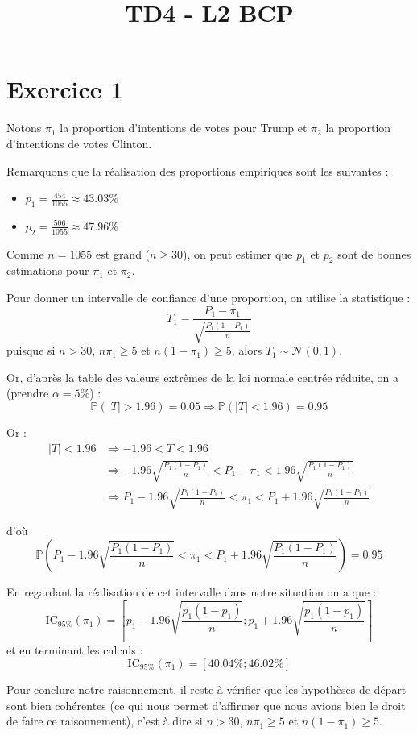 \documentclass[a4paper,oneside,12pt]{article}
\title{TD4 - L2 BCP}
\author{}
\date{}
\theoremstyle{plain}
\def\P{{\mathbb P}}
\begin{document}
\maketitle

\section*{Exercice 1}
Notons $\pi_1$ la proportion d'intentions de votes pour Trump et $\pi_2$ la proportion d'intentions de votes Clinton.

Remarquons que la réalisation des proportions empiriques sont les suivantes :
\begin{itemize}
    \item $p_1 = \frac{454}{1055} \approx 43.03\%$
    \item $p_2 = \frac{506}{1055} \approx 47.96\%$
\end{itemize}

Comme $n = 1055$ est grand ($n\ge 30$), on peut estimer que $p_1$ et $p_2$ sont de bonnes estimations pour $\pi_1$ et $\pi_2$.

Pour donner un intervalle de confiance d'une proportion, on utilise la statistique :
$$T_1 = \frac{P_1-\pi_1}{\sqrt{\frac{P_1(1-P_1)}{n}}}$$
puisque si $n>30$, $n\pi_1\ge 5$ et $n(1-\pi_1)\ge 5$, alors $T_1 \sim \mathcal{N}(0,1)$.

Or, d'après la table des valeurs extrêmes de la loi normale centrée réduite, on a (prendre $\alpha = 5\%$) :
$$\P(|T|>1.96) = 0.05 \Rightarrow \P(|T|<1.96) = 0.95$$

Or :
\begin{align*}
    |T|<1.96 &\Rightarrow -1.96 < T < 1.96\\
    & \Rightarrow -1.96\sqrt{\frac{P_1(1-P_1)}{n}}<P_1-\pi_1<1.96\sqrt{\frac{P_1(1-P_1)}{n}}\\
    & \Rightarrow P_1 -1.96\sqrt{\frac{P_1(1-P_1)}{n}}<\pi_1<P_1+1.96\sqrt{\frac{P_1(1-P_1)}{n}}
\end{align*}

d'où $$\P\left( P_1 -1.96\sqrt{\frac{P_1(1-P_1)}{n}}<\pi_1<P_1+1.96\sqrt{\frac{P_1(1-P_1)}{n}}\right) = 0.95$$

En regardant la réalisation de cet intervalle dans notre situation on a que :
$$\mbox{IC}_{95\%}(\pi_1) = \left[p_1-1.96\sqrt{\frac{p_1(1-p_1)}{n}} ; p_1+1.96\sqrt{\frac{p_1(1-p_1)}{n}}\right]$$
et en terminant les calculs :
$$\mbox{IC}_{95\%}(\pi_1) = [40.04\%;46.02\%]$$

Pour conclure notre raisonnement, il reste à vérifier que les hypothèses de départ sont bien cohérentes (ce qui nous permet d'affirmer que nous avions bien le droit de faire ce raisonnement), c'est à dire si $n>30$, $n\pi_1\ge 5$ et $n(1-\pi_1)\ge 5$.
\end{document}
